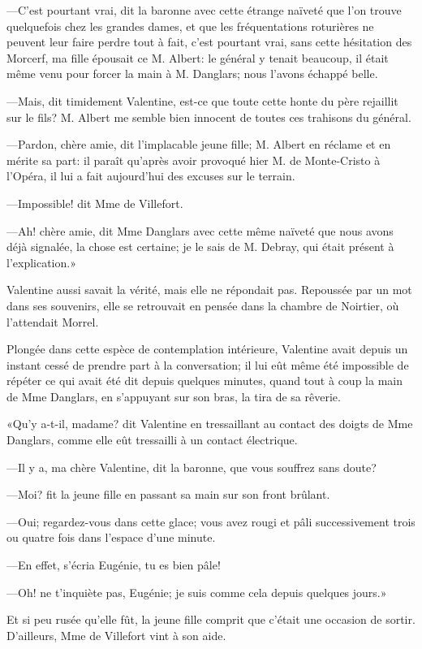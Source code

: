 —C'est pourtant vrai, dit la baronne avec cette étrange naïveté que l'on trouve quelquefois chez les grandes dames, et que les fréquentations roturières ne peuvent leur faire perdre tout à fait, c'est pourtant vrai, sans cette hésitation des Morcerf, ma fille épousait ce M. Albert: le général y tenait beaucoup, il était même venu pour forcer la main à M. Danglars; nous l'avons échappé belle. 

—Mais, dit timidement Valentine, est-ce que toute cette honte du père rejaillit sur le fils? M. Albert me semble bien innocent de toutes ces trahisons du général. 

—Pardon, chère amie, dit l'implacable jeune fille; M. Albert en réclame et en mérite sa part: il paraît qu'après avoir provoqué hier M. de Monte-Cristo à l'Opéra, il lui a fait aujourd'hui des excuses sur le terrain. 

—Impossible! dit Mme de Villefort. 

—Ah! chère amie, dit Mme Danglars avec cette même naïveté que nous avons déjà signalée, la chose est certaine; je le sais de M. Debray, qui était présent à l'explication.» 

Valentine aussi savait la vérité, mais elle ne répondait pas. Repoussée par un mot dans ses souvenirs, elle se retrouvait en pensée dans la chambre de Noirtier, où l'attendait Morrel. 

Plongée dans cette espèce de contemplation intérieure, Valentine avait depuis un instant cessé de prendre part à la conversation; il lui eût même été impossible de répéter ce qui avait été dit depuis quelques minutes, quand tout à coup la main de Mme Danglars, en s'appuyant sur son bras, la tira de sa rêverie. 

«Qu'y a-t-il, madame? dit Valentine en tressaillant au contact des doigts de Mme Danglars, comme elle eût tressailli à un contact électrique. 

—Il y a, ma chère Valentine, dit la baronne, que vous souffrez sans doute? 

—Moi? fit la jeune fille en passant sa main sur son front brûlant. 

—Oui; regardez-vous dans cette glace; vous avez rougi et pâli successivement trois ou quatre fois dans l'espace d'une minute. 

—En effet, s'écria Eugénie, tu es bien pâle! 

—Oh! ne t'inquiète pas, Eugénie; je suis comme cela depuis quelques jours.» 

Et si peu rusée qu'elle fût, la jeune fille comprit que c'était une occasion de sortir. D'ailleurs, Mme de Villefort vint à son aide. 

